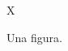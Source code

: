 \documentclass{article}
\begin{document}
\makeatletter\texttt{\meaning\@makecaption}\makeatother
\begin{figure}
\centering X
\caption{Una figura.}
\end{figure}
\end{document}
